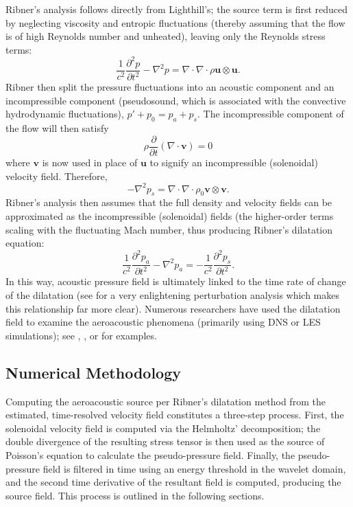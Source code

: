 Ribner's analysis follows directly from Lighthill's; the source term is first reduced by neglecting viscosity and entropic fluctuations (thereby assuming that the flow is of high Reynolds number and unheated), leaving only the Reynolds stress terms:
\begin{equation}
	\frac{1}{c^2}\frac{\partial^2 p}{\partial t^2} - \nabla^2 p = \nabla \cdot \nabla \cdot \rho \mathbf{u} \otimes \mathbf{u}.
\end{equation}
Ribner then split the pressure fluctuations into an acoustic component and an incompressible component (pseudosound, which is associated with the convective hydrodynamic fluctuations), $p' + p_0 = p_a + p_s$. 
The incompressible component of the flow will then satisfy
\begin{equation}
	 \rho \frac{\partial}{\partial t} (\nabla \cdot \mathbf{v} )  = 0
\end{equation}
where $\mathbf{v}$ is now used in place of $\mathbf{u}$ to signify an incompressible (solenoidal) velocity field. 
Therefore, 
\begin{equation}
	- \nabla^2 p_s = \nabla \cdot \nabla \cdot \rho_0 \mathbf{v} \otimes \mathbf{v}.
	\label{eq:solenoidal_pressure}
\end{equation}
Ribner's analysis then assumes that the full density and velocity fields can be approximated as the incompressible (solenoidal) fields (the higher-order terms scaling with the fluctuating Mach number, thus producing Ribner's dilatation equation:
\begin{equation}
	\frac{1}{c^2}\frac{\partial^2 p_a}{\partial t^2} - \nabla^2 p_a = -\frac{1}{c^2}\frac{\partial^2 p_s}{\partial t^2}.
	\label{eq:ribner_source}
\end{equation} 
In this way, acoustic pressure field is ultimately linked to the time rate of change of the dilatation (see \citet{Ristorcelli1997} for a very enlightening perturbation analysis which makes this relationship far more clear).
Numerous researchers have used the dilatation field to examine the aeroacoustic phenomena (primarily using DNS or LES simulations); see \citet{Mitchell1995}, \citet{Colonius1997}, or \citet{Freund2000} for examples.

\subsection{Numerical Methodology}
Computing the aeroacoustic source per Ribner's dilatation method from the estimated, time-resolved velocity field constitutes a three-step process. 
First, the solenoidal velocity field is computed via the Helmholtz' decomposition; the double divergence of the resulting stress tensor is then used as the source of Poisson's equation to calculate the pseudo-pressure field. 
Finally, the pseudo-pressure field is filtered in time using an energy threshold in the wavelet domain, and the second time derivative of the resultant field is computed, producing the source field.
This process is outlined in the following sections.
